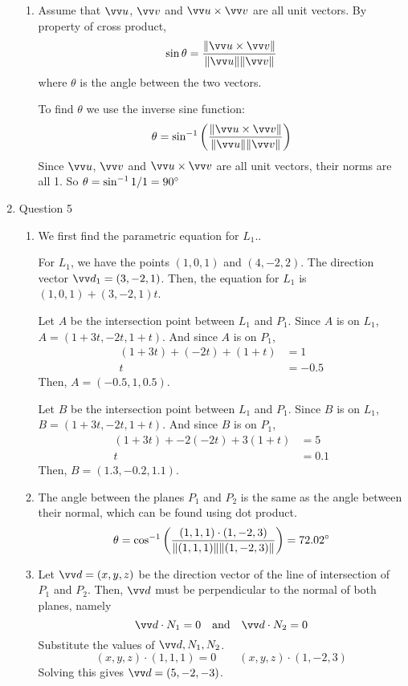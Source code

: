 \documentclass[11pt]{article}
\newcommand{\norm}[1]{\lVert #1 \rVert}
\begin{document}
\begin{enumerate}
\begin{enumerate}
        \item Assume that $\vv u$, $\vv v$ and $\vv u \times \vv v$ are all unit vectors. By property of cross product,
        $$
        \sin\theta = \frac{\norm{\vv u \times \vv v}}{\norm{\vv u}\norm{\vv v}}
        $$
        where $\theta$ is the angle between the two vectors.
        
        To find $\theta$ we use the inverse sine function:
        $$
        \theta = \sin^{-1}\left( \frac{\norm{\vv u \times \vv v}}{\norm{\vv u}\norm{\vv v}} \right)
        $$
        Since $\vv u$, $\vv v$ and $\vv u \times \vv v$ are all unit vectors, their norms are all 1. So $\theta = \sin^{-1}1/1 = 90\degree$
    \end{enumerate}
    \item Question 5
    \begin{enumerate}
        \item We first find the parametric equation for $L_1$.. 
        
        For $L_1$, we have the points $(1,0,1)$ and $(4,-2,2)$. The direction vector $\vv d_1 = (3,-2,1)$. Then, the equation for $L_1$ is $(1,0,1) + (3,-2,1)t$.
        
        Let $A$ be the intersection point between $L_1$ and $P_1$. Since $A$ is on $L_1$, $A=(1+3t,-2t,1+t)$. And since $A$ is on $P_1$,
        \begin{align*}
            (1+3t)+(-2t)+(1+t) &= 1 \\
            t &= -0.5
        \end{align*}
        Then, $A=(-0.5,1,0.5)$.
        
        Let $B$ be the intersection point between $L_1$ and $P_1$. Since $B$ is on $L_1$, $B=(1+3t,-2t,1+t)$. And since $B$ is on $P_1$,
        \begin{align*}
            (1+3t)+-2(-2t)+3(1+t) &= 5 \\
            t &= 0.1
        \end{align*}
        Then, $B=(1.3,-0.2,1.1)$.
        
        \item The angle between the planes $P_1$ and $P_2$ is the same as the angle between their normal, which can be found using dot product.
        $$
        \theta = \cos^{-1} \left( \frac{(1,1,1) \cdot (1,-2,3)}{\norm{(1,1,1)} \norm{(1,-2,3)}} \right) = 72.02\degree
        $$
        
        \item Let $\vv d = (x,y,z)$ be the direction vector of the line of intersection of $P_1$ and $P_2$. Then, $\vv d$ must be perpendicular to the normal of both planes, namely
        $$
        \vv d \cdot N_1 = 0 \quad \text{and} \quad \vv d \cdot N_2 = 0
        $$
        Substitute the values of $\vv d, N_1, N_2$.
        $$
        (x,y,z) \cdot (1,1,1) = 0 \qquad (x,y,z) \cdot (1,-2,3)
        $$
        Solving this gives $\vv d = (5,-2,-3)$.
        

\end{enumerate}
\end{enumerate}
\end{document}

